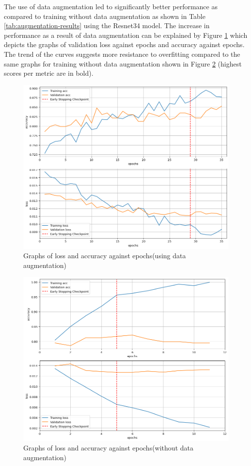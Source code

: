 \documentclass[12pt, a4paper]{article}
\begin{document}
The use of data augmentation led to significantly better performance as compared to training without data augmentation as shown in Table \ref{tab:augmentation-results} using the Resnet34 model. The increase in performance as a result of data augmentation can be explained by Figure \ref{fig:resnet34_aug} which depicts the graphs of validation loss against epochs and accuracy against epochs. The trend of the curves suggests more resistance to overfitting compared to the same graphs for training without data augmentation shown in Figure \ref{fig:resnet34_no_aug} (highest scores per metric are in bold).

\begin{figure}[h]
    \centering
    \setlength{\fboxsep}{8pt}
    \includegraphics[scale=0.5, fbox]{images/resnet34-aug-loss.png}
    \caption{Graphs of loss and accuracy against epochs(using data augmentation)}
    \label{fig:resnet34_aug}
\end{figure}

\begin{figure}[h]
    \centering
    \setlength{\fboxsep}{8pt}
    \includegraphics[scale=0.5, fbox]{images/resnet34-noaug-loss.png}
    \caption{Graphs of loss and accuracy against epochs(without data augmentation)}
    \label{fig:resnet34_no_aug}
\end{figure}
\end{document}
